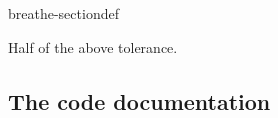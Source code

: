 \documentclass[letterpaper,10pt,english]{sphinxmanual}
\begin{document}
\begin{fulllineitems}
\begin{sphinxuseclass}{breathe-sectiondef}
\begin{fulllineitems}
\label{\detokenize{Simulation/SimulationCodeDoc:_CPPv4N3Box6fDeltaE}}
\pysigstartsignatures
\pysigstartmultiline
{}
\pysigstopmultiline
\pysigstopsignatures
\sphinxAtStartPar
Half of the above tolerance. 

\end{fulllineitems}


\end{sphinxuseclass}
\end{fulllineitems}



\subsection{The  code documentation}
\label{\detokenize{Simulation/SimulationCodeDoc:the-physics-code-documentation}}
\end{document}
